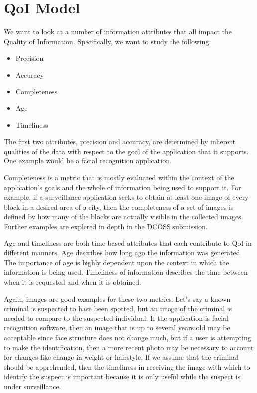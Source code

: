 \section{QoI Model}
\label{sec:qoi_model}

We want to look at a number of information attributes that all impact the Quality of Information.  Specifically, we want to study the following:

\begin{itemize}
  \item Precision
  \item Accuracy
  \item Completeness
  \item Age
  \item Timeliness
\end{itemize}

The first two attributes, precision and accuracy, are determined by inherent qualities of the data with respect to the goal of the application that it supports.  One example would be a facial recognition application.  

Completeness is a metric that is mostly evaluated within the context of the application's goals and the whole of information being used to support it.  For example, if a surveillance application seeks to obtain at least one image of every block in a desired area of a city, then the completeness of a set of images is defined by how many of the blocks are actually visible in the collected images.  Further examples are explored in depth in the DCOSS submission.

Age and timeliness are both time-based attributes that each contribute to QoI in different manners.  Age describes how long ago the information was generated.  The importance of age is highly dependent upon the context in which the information is being used.  Timeliness of information describes the time between when it is requested and when it is obtained.  

Again, images are good examples for these two metrics.  Let's say a known criminal is suspected to have been spotted, but an image of the criminal is needed to compare to the suspected individual.  If the application is facial recognition software, then an image that is up to several years old may be acceptable since face structure does not change much, but if a user is attempting to make the identification, then a more recent photo may be necessary to account for changes like change in weight or hairstyle.  If we assume that the criminal should be apprehended, then the timeliness in receiving the image with which to identify the suspect is important because it is only useful while the suspect is under surveillance.  

